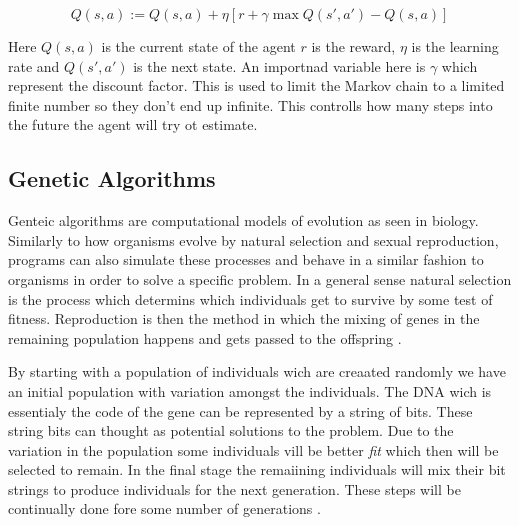 \begin{equation}
    { Q(s,a) := Q(s,a) + \eta [r + \gamma \max Q(s',a') - Q(s,a)]}
\end{equation}

Here $Q(s,a)$ is the current state of the agent $r$ is the reward, $\eta$ is the learning rate and $Q(s',a')$ is the next state. An importnad variable here is $\gamma$ which represent the discount factor. This is used to limit the Markov chain to a limited finite number so they don't end up infinite. This controlls how many steps into the future the agent will try ot estimate. 


\subsection{Genetic Algorithms}

Genteic algorithms are computational models of evolution as seen in biology. Similarly to how organisms evolve by natural selection and sexual reproduction, programs can also simulate these processes and behave in a similar fashion to organisms in order to solve a specific problem. In a general sense natural selection is the process which determins which individuals get to survive by some test of fitness. Reproduction is then the method in which the mixing of genes in the remaining population happens and gets passed to the offspring \cite{holland1992genetic}.

By starting with a population of individuals wich are creaated randomly we have an initial population with variation amongst the individuals. The DNA wich is essentialy the code of the gene can be represented by a string of bits. These string bits can thought as potential solutions to the problem. Due to the variation in the population some individuals vill be better \textit{fit} which then will be selected to remain. In the final stage the remaiining individuals will mix their bit strings to produce individuals for the next generation. These steps will be continually done fore some number of generations \cite{forrest1996genetic}. 



